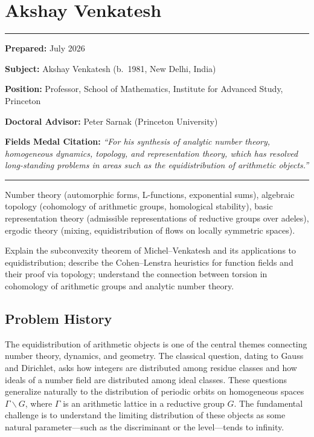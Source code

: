 \chapter{Akshay Venkatesh}\label{ch2018akshayvenkatesh:akshay-venkatesh-fields-medal-2018-a-comprehensive-report-on-his-work-and-impact}

\begin{center}\rule{0.5\linewidth}{0.5pt}\end{center}

\textbf{Prepared:} July 2026

\textbf{Subject:} Akshay Venkatesh (b.\ 1981, New Delhi, India)

\textbf{Position:} Professor, School of Mathematics, Institute for Advanced Study, Princeton

\textbf{Doctoral Advisor:} Peter Sarnak (Princeton University)

\textbf{Fields Medal Citation:} \emph{``For his synthesis of analytic number theory, homogeneous dynamics, topology, and representation theory, which has resolved long-standing problems in areas such as the equidistribution of arithmetic objects.''}

\begin{center}\rule{0.5\linewidth}{0.5pt}\end{center}

\begin{prereqs}
Number theory (automorphic forms, L-functions, exponential sums), algebraic topology (cohomology of arithmetic groups, homological stability), basic representation theory (admissible representations of reductive groups over adeles), ergodic theory (mixing, equidistribution of flows on locally symmetric spaces).
\end{prereqs}

\begin{objectives}
Explain the subconvexity theorem of Michel--Venkatesh and its applications to equidistribution; describe the Cohen--Lenstra heuristics for function fields and their proof via topology; understand the connection between torsion in cohomology of arithmetic groups and analytic number theory.
\end{objectives}

\section{Problem History}

The equidistribution of arithmetic objects is one of the central themes connecting number theory, dynamics, and geometry. The classical question, dating to Gauss and Dirichlet, asks how integers are distributed among residue classes and how ideals of a number field are distributed among ideal classes. These questions generalize naturally to the distribution of periodic orbits on homogeneous spaces $\Gamma \backslash G$, where $\Gamma$ is an arithmetic lattice in a reductive group $G$. The fundamental challenge is to understand the limiting distribution of these objects as some natural parameter---such as the discriminant or the level---tends to infinity.

